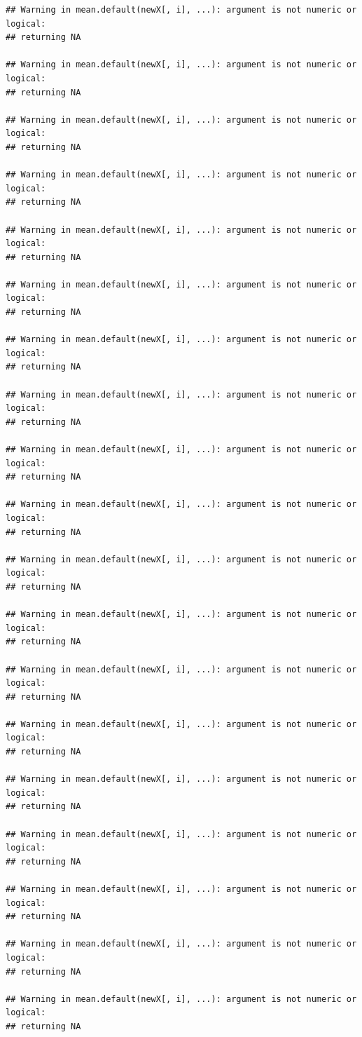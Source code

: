\documentclass[
]{book}
\begin{document}
\begin{verbatim}
## Warning in mean.default(newX[, i], ...): argument is not numeric or logical:
## returning NA

## Warning in mean.default(newX[, i], ...): argument is not numeric or logical:
## returning NA

## Warning in mean.default(newX[, i], ...): argument is not numeric or logical:
## returning NA

## Warning in mean.default(newX[, i], ...): argument is not numeric or logical:
## returning NA

## Warning in mean.default(newX[, i], ...): argument is not numeric or logical:
## returning NA

## Warning in mean.default(newX[, i], ...): argument is not numeric or logical:
## returning NA

## Warning in mean.default(newX[, i], ...): argument is not numeric or logical:
## returning NA

## Warning in mean.default(newX[, i], ...): argument is not numeric or logical:
## returning NA

## Warning in mean.default(newX[, i], ...): argument is not numeric or logical:
## returning NA

## Warning in mean.default(newX[, i], ...): argument is not numeric or logical:
## returning NA

## Warning in mean.default(newX[, i], ...): argument is not numeric or logical:
## returning NA

## Warning in mean.default(newX[, i], ...): argument is not numeric or logical:
## returning NA

## Warning in mean.default(newX[, i], ...): argument is not numeric or logical:
## returning NA

## Warning in mean.default(newX[, i], ...): argument is not numeric or logical:
## returning NA

## Warning in mean.default(newX[, i], ...): argument is not numeric or logical:
## returning NA

## Warning in mean.default(newX[, i], ...): argument is not numeric or logical:
## returning NA

## Warning in mean.default(newX[, i], ...): argument is not numeric or logical:
## returning NA

## Warning in mean.default(newX[, i], ...): argument is not numeric or logical:
## returning NA

## Warning in mean.default(newX[, i], ...): argument is not numeric or logical:
## returning NA


\end{verbatim}
\end{document}
